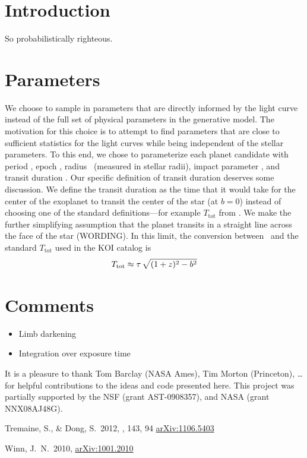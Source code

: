 \documentclass[12pt,preprint]{aastex}
\begin{document}
\section{Introduction}

So probabilistically righteous.

\section{Parameters}

We choose to sample in parameters that are directly informed by the light
curve instead of the full set of physical parameters in the generative model.
The motivation for this choice is to attempt to find parameters that are close
to sufficient statistics for the light curves while being independent of the
stellar parameters.
To this end, we chose to parameterize each planet candidate with period
\period, epoch \epoch, radius \ror\ (measured in stellar radii), impact
parameter \impact, and transit duration \duration.
Our specific definition of transit duration deserves some discussion.
We define the transit duration as the time that it would take for the
center of the exoplanet to transit the center of the star (at $b=0$) instead
of choosing one of the standard definitions---for example $T_\mathrm{tot}$
from \citet{winn}.
We make the further simplifying assumption that the planet transits in a
straight line across the face of the star (WORDING).
In this limit, the conversion between \duration\ and the standard
$T_\mathrm{tot}$ used in the KOI catalog is
\begin{eqnarray}
T_\mathrm{tot} \approx \tau \, \sqrt{(1+z)^2 - b^2}
\end{eqnarray}

\section{Comments}

\begin{itemize}
\item{Limb darkening}
\item{Integration over exposure time}
\end{itemize}

\acknowledgments
It is a pleasure to thank
    Tom Barclay (NASA Ames),
    Tim Morton (Princeton),
    \ldots
for helpful contributions to the ideas and code presented here.
This project was partially supported by the NSF (grant AST-0908357), and NASA
(grant NNX08AJ48G).

\newcommand{\arxiv}[1]{\href{http://arxiv.org/abs/#1}{arXiv:#1}}
\begin{thebibliography}{}\raggedright

Tremaine, S., \& Dong, S.\ 2012, \aj, 143, 94
\arxiv{1106.5403}

Winn, J.~N.\ 2010, \arxiv{1001.2010}

\end{thebibliography}
\end{document}

